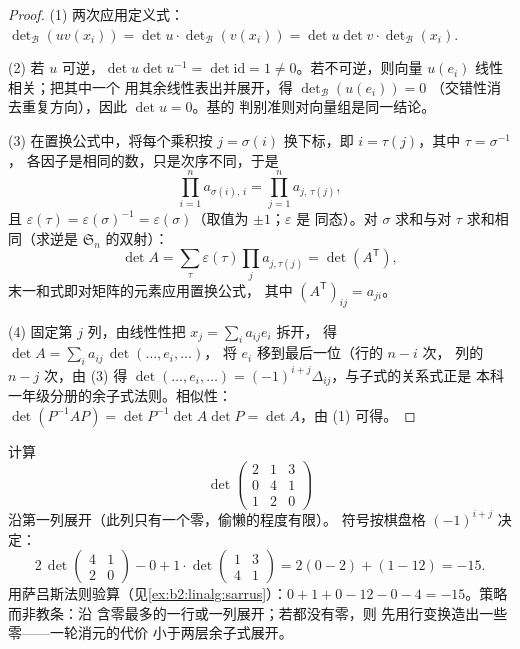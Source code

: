 \begin{proof}
(1) 两次应用定义式：
$\det_{\mathcal B}(uv(x_i)) = \det u \cdot \det_{\mathcal
B}(v(x_i)) = \det u \det v \cdot \det_{\mathcal B}(x_i)$.

(2) 若 $u$ 可逆，$\det u \det u^{-1} = \det \mathrm{id} =
1 \neq 0$。若不可逆，则向量 $u(e_i)$ 线性相关；把其中一个
用其余线性表出并展开，得 $\det_{\mathcal B}(u(e_i)) = 0$
（交错性消去重复方向），因此 $\det u = 0$。基的
判别准则对向量组是同一结论。

(3) 在置换公式中，将每个乘积按 $j =
\sigma(i)$ 换下标，即 $i = \tau(j)$，其中 $\tau = \sigma^{-1}$，
各因子是相同的数，只是次序不同，于是
\[
\prod_{i=1}^{n} a_{\sigma(i),\,i} = \prod_{j=1}^{n}
a_{j,\,\tau(j)} ,
\]
且 $\varepsilon(\tau) = \varepsilon(\sigma)^{-1} =
\varepsilon(\sigma)$（取值为 $\pm1$；$\varepsilon$ 是
同态）。对 $\sigma$ 求和与对
$\tau$ 求和相同（求逆是 $\mathfrak{S}_n$ 的双射）：
\[
\det A = \sum_{\tau}\varepsilon(\tau)\prod_j a_{j,\tau(j)}
= \det(A^{\mathsf T}),
\]
末一和式即对矩阵的元素应用置换公式，
其中 $(A^{\mathsf T})_{ij} = a_{ji}$。

(4) 固定第 $j$ 列，由线性性把 $x_j = \sum_i a_{ij} e_i$ 拆开，
得 $\det A = \sum_i a_{ij}\, \det(\dots, e_i, \dots)$，
将 $e_i$ 移到最后一位（行的 $n - i$ 次，
列的 $n - j$ 次，由 (3) 得 $\det(\dots, e_i, \dots) =
(-1)^{i+j}\Delta_{ij}$，与子式的关系式正是
本科一年级分册的余子式法则。相似性：$\det(P^{-1}AP) = \det P^{-1}\det A \det P =
\det A$，由 (1) 可得。
\end{proof}

\begin{example}[余子式展开的具体计算]\label{ex:b2:linalg:cofactorwork}
计算
\[
\det\begin{pmatrix}
2 & 1 & 3\\
0 & 4 & 1\\
1 & 2 & 0
\end{pmatrix}
\]
沿第一列展开（此列只有一个零，偷懒的程度有限）。
符号按棋盘格 $(-1)^{i+j}$ 决定：
\[
2\,\det\begin{pmatrix}4 & 1\\ 2 & 0\end{pmatrix}
- 0
+ 1\cdot\det\begin{pmatrix}1 & 3\\ 4 & 1\end{pmatrix}
= 2(0 - 2) + (1 - 12) = -15 .
\]
用萨吕斯法则验算（见\cref{ex:b2:linalg:sarrus}）：$0 + 1 + 0
- 12 - 0 - 4 = -15$。策略而非教条：沿
含零最多的一行或一列展开；若都没有零，则
先用行变换造出一些零——一轮消元的代价
小于两层余子式展开。
\end{example}

